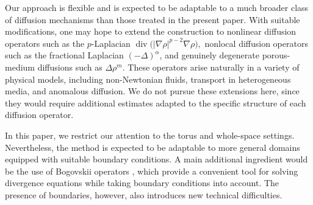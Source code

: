 \documentclass[10pt,a4paper]{amsart}
\numberwithin{equation}{section}
\begin{document}
Our approach is flexible and is expected to be adaptable to a much broader
class of diffusion mechanisms than those treated in the present paper. With
suitable modifications, one may hope to extend the construction to nonlinear
diffusion operators such as the $p$-Laplacian
$
\operatorname{div}\bigl(|\nabla\rho|^{p-2}\nabla\rho\bigr),
$
nonlocal diffusion operators such as the fractional Laplacian
$(-\Delta)^\alpha$, and genuinely degenerate porous-medium diffusions such as
$
\Delta \rho^m .
$
These operators arise naturally in a variety of physical models, including
non-Newtonian fluids, transport in heterogeneous media, and anomalous
diffusion. We do not pursue these extensions here, since they would require
additional estimates adapted to the specific structure of each diffusion
operator.

In this paper, we restrict our attention to the torus and whole-space settings.
Nevertheless, the method is expected to be adaptable to more general domains
equipped with suitable boundary conditions. A main additional ingredient would
be the use of Bogovskii operators \cite{Bog79}, which provide a convenient
tool for solving divergence equations while taking boundary conditions into
account. The presence of boundaries, however, also introduces new technical
difficulties.
 
\end{document}
